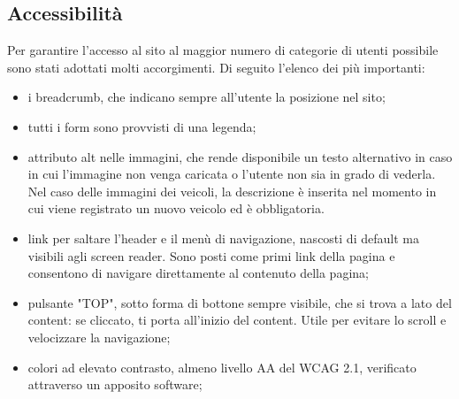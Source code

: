     \subsection{Accessibilità}
    Per garantire l'accesso al sito al maggior numero di categorie di utenti possibile sono stati adottati molti accorgimenti.
    Di seguito l'elenco dei più importanti:
    \begin{itemize}
        \item i breadcrumb, che indicano sempre all'utente la posizione nel sito;
        \item tutti i form sono provvisti di una legenda;
        \item attributo alt nelle immagini, che rende disponibile un testo alternativo in caso in cui l’immagine non venga caricata o l'utente non sia in grado di vederla. Nel caso delle immagini dei veicoli, la descrizione è inserita nel momento in cui viene registrato un nuovo veicolo ed è obbligatoria.
        \item link per saltare l'header e il menù di navigazione, nascosti di default ma visibili agli screen reader. Sono posti come primi link della pagina e consentono di navigare direttamente al contenuto della pagina;
        \item pulsante "TOP", sotto forma di bottone sempre visibile, che si trova a lato del content: se cliccato, ti porta all’inizio del content. Utile per evitare lo scroll e velocizzare la navigazione;
        \item colori ad elevato contrasto, almeno livello AA del WCAG 2.1, verificato attraverso un apposito software;
    \end{itemize}
\pagebreak